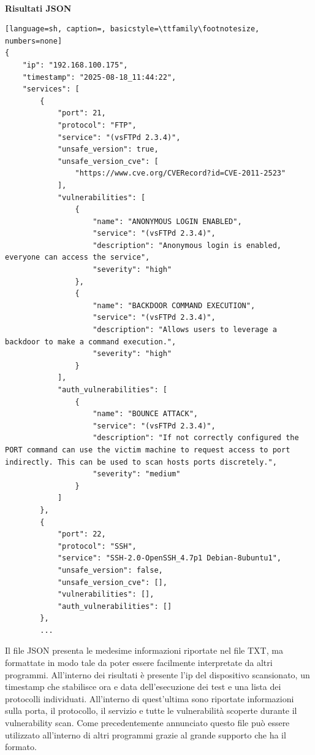 \documentclass[12pt]{report}
\begin{document}
\noindent
\\
\textbf{Risultati JSON}
\begin{lstlisting}[language=sh, caption=, basicstyle=\ttfamily\footnotesize, numbers=none]
{
    "ip": "192.168.100.175",
    "timestamp": "2025-08-18_11:44:22",
    "services": [
        {
            "port": 21,
            "protocol": "FTP",
            "service": "(vsFTPd 2.3.4)",
            "unsafe_version": true,
            "unsafe_version_cve": [
                "https://www.cve.org/CVERecord?id=CVE-2011-2523"
            ],
            "vulnerabilities": [
                {
                    "name": "ANONYMOUS LOGIN ENABLED",
                    "service": "(vsFTPd 2.3.4)",
                    "description": "Anonymous login is enabled, everyone can access the service",
                    "severity": "high"
                },
                {
                    "name": "BACKDOOR COMMAND EXECUTION",
                    "service": "(vsFTPd 2.3.4)",
                    "description": "Allows users to leverage a backdoor to make a command execution.",
                    "severity": "high"
                }
            ],
            "auth_vulnerabilities": [
                {
                    "name": "BOUNCE ATTACK",
                    "service": "(vsFTPd 2.3.4)",
                    "description": "If not correctly configured the PORT command can use the victim machine to request access to port indirectly. This can be used to scan hosts ports discretely.",
                    "severity": "medium"
                }
            ]
        },
        {
            "port": 22,
            "protocol": "SSH",
            "service": "SSH-2.0-OpenSSH_4.7p1 Debian-8ubuntu1",
            "unsafe_version": false,
            "unsafe_version_cve": [],
            "vulnerabilities": [],
            "auth_vulnerabilities": []
        },
        ...
\end{lstlisting}
Il file JSON presenta le medesime informazioni riportate nel file TXT, ma formattate in modo tale da poter essere facilmente interpretate da altri programmi. All'interno dei risultati è presente l'ip del dispositivo scansionato, un timestamp che stabilisce ora e data dell'esecuzione dei test e una lista dei protocolli individuati. All'interno di quest'ultima sono riportate informazioni sulla porta, il protocollo, il servizio e tutte le vulnerabilità scoperte durante il vulnerability scan. Come precedentemente annunciato questo file può essere utilizzato all'interno di altri programmi grazie al grande supporto che ha il formato.
\end{document}
